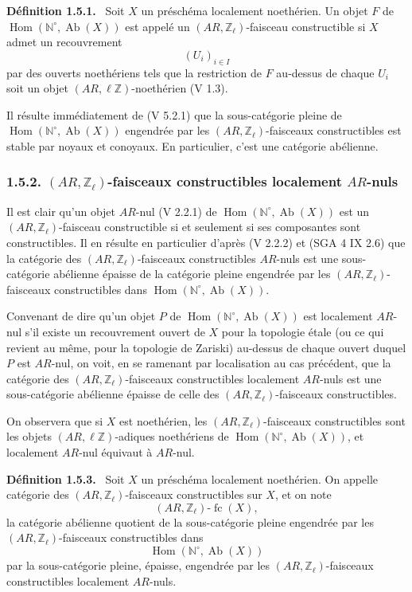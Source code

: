 \documentclass[11pt]{article}
\newenvironment{statement}[1]{\par\medskip\noindent\textbf{#1.}\ }{\par\medskip}
\DeclareMathOperator{\Hom}{Hom}
\providecommand{\Hom}{\operatorname{Hom}}
\providecommand{\Ab}{\operatorname{Ab}}
\providecommand{\fc}{\operatorname{fc}}
\providecommand{\Ab}{\operatorname{Ab}}
\providecommand{\Hom}{\operatorname{Hom}}
\begin{document}
\begin{statement}{Définition 1.5.1}
Soit \(X\) un préschéma localement noethérien. Un objet \(F\) de \(\Hom(\mathbb N^\circ,\Ab(X))\) est appelé un \((AR,\mathbb Z_\ell)\)-faisceau constructible si \(X\) admet un recouvrement
\[
(U_i)_{i\in I}
\]
par des ouverts noethériens tels que la restriction de \(F\) au-dessus de chaque \(U_i\) soit un objet \((AR,\ell\mathbb Z)\)-noethérien (V 1.3).
\end{statement}

Il résulte immédiatement de (V 5.2.1) que la sous-catégorie pleine de \(\Hom(\mathbb N^\circ,\Ab(X))\) engendrée par les \((AR,\mathbb Z_\ell)\)-faisceaux constructibles est stable par noyaux et conoyaux. En particulier, c'est une catégorie abélienne.

\subsubsection*{1.5.2. \((AR,\mathbb Z_\ell)\)-faisceaux constructibles localement \(AR\)-nuls}

Il est clair qu'un objet \(AR\)-nul (V 2.2.1) de \(\Hom(\mathbb N^\circ,\Ab(X))\) est un \((AR,\mathbb Z_\ell)\)-faisceau constructible si et seulement si ses composantes sont constructibles. Il en résulte en particulier d'après (V 2.2.2) et (SGA 4 IX 2.6) que la catégorie des \((AR,\mathbb Z_\ell)\)-faisceaux constructibles \(AR\)-nuls est une sous-catégorie abélienne épaisse de la catégorie pleine engendrée par les \((AR,\mathbb Z_\ell)\)-faisceaux constructibles dans \(\Hom(\mathbb N^\circ,\Ab(X))\).

Convenant de dire qu'un objet \(P\) de \(\Hom(\mathbb N^\circ,\Ab(X))\) est localement \(AR\)-nul s'il existe un recouvrement ouvert de \(X\) pour la topologie étale (ou ce qui revient au même, pour la topologie de Zariski) au-dessus de chaque ouvert duquel \(P\) est \(AR\)-nul, on voit, en se ramenant par localisation au cas précédent, que la catégorie des \((AR,\mathbb Z_\ell)\)-faisceaux constructibles localement \(AR\)-nuls est une sous-catégorie abélienne épaisse de celle des \((AR,\mathbb Z_\ell)\)-faisceaux constructibles.

On observera que si \(X\) est noethérien, les \((AR,\mathbb Z_\ell)\)-faisceaux constructibles sont les objets \((AR,\ell\mathbb Z)\)-adiques noethériens de \(\Hom(\mathbb N^\circ,\Ab(X))\), et localement \(AR\)-nul équivaut à \(AR\)-nul.

\begin{statement}{Définition 1.5.3}
Soit \(X\) un préschéma localement noethérien. On appelle catégorie des \((AR,\mathbb Z_\ell)\)-faisceaux constructibles sur \(X\), et on note
\[
(AR,\mathbb Z_\ell)\text{-}\fc(X),
\]
la catégorie abélienne quotient de la sous-catégorie pleine engendrée par les \((AR,\mathbb Z_\ell)\)-faisceaux constructibles dans
\[
\Hom(\mathbb N^\circ,\Ab(X))
\]
par la sous-catégorie pleine, épaisse, engendrée par les \((AR,\mathbb Z_\ell)\)-faisceaux constructibles localement \(AR\)-nuls.
\end{statement}
\end{document}
